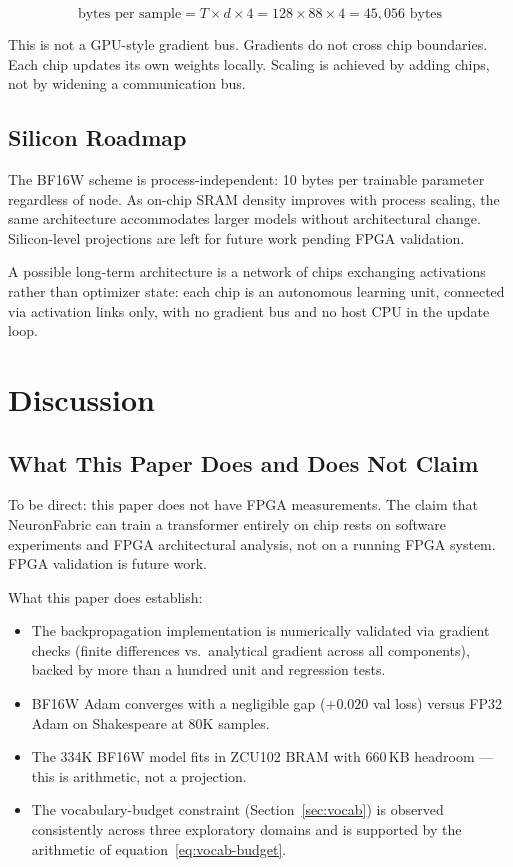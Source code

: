 \documentclass[11pt]{article}
\newcommand{\bfsixteenloss}{0.020}
\begin{document}
\begin{equation}
\text{bytes per sample} = T \times d \times 4 = 128 \times 88 \times 4 = 45{,}056 \text{ bytes}
\end{equation}

This is not a GPU-style gradient bus. Gradients do not cross chip boundaries.
Each chip updates its own weights locally. Scaling is achieved by adding chips,
not by widening a communication bus.

\subsection{Silicon Roadmap}

The BF16W scheme is process-independent: 10 bytes per trainable parameter regardless of node.
As on-chip SRAM density improves with process scaling, the same architecture accommodates
larger models without architectural change. Silicon-level projections are left for future work
pending FPGA validation.

A possible long-term architecture is a network of chips exchanging activations rather
than optimizer state: each chip is an autonomous learning unit, connected via activation
links only, with no gradient bus and no host CPU in the update loop.

\section{Discussion}

\subsection{What This Paper Does and Does Not Claim}

To be direct: this paper does not have FPGA measurements. The claim that NeuronFabric
can train a transformer entirely on chip rests on software experiments and FPGA
architectural analysis, not on a running FPGA system. FPGA validation is future work.

What this paper does establish:

\begin{itemize}
  \item The backpropagation implementation is numerically validated via gradient checks
    (finite differences vs.\ analytical gradient across all components), backed by more
    than a hundred unit and regression tests.
  \item BF16W Adam converges with a negligible gap ($+\bfsixteenloss$ val loss) versus FP32 Adam on Shakespeare at 80K samples.
  \item The 334K BF16W model fits in ZCU102 BRAM with 660\,KB headroom --- this is
    arithmetic, not a projection.
  \item The vocabulary-budget constraint (Section~\ref{sec:vocab}) is observed consistently across three exploratory domains and is supported by the arithmetic of equation~\ref{eq:vocab-budget}.
\end{itemize}
\end{document}
